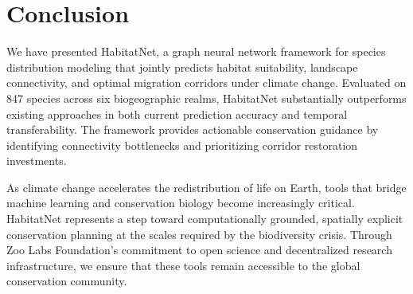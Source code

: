 \section{Conclusion}

\label{sec:conclusion}

We have presented HabitatNet, a graph neural network framework for
species distribution modeling that jointly predicts habitat suitability,
landscape connectivity, and optimal migration corridors under climate
change. Evaluated on 847 species across six biogeographic realms,
HabitatNet substantially outperforms existing approaches in both current
prediction accuracy and temporal transferability. The framework provides
actionable conservation guidance by identifying connectivity bottlenecks
and prioritizing corridor restoration investments.

As climate change accelerates the redistribution of life on Earth, tools
that bridge machine learning and conservation biology become increasingly
critical. HabitatNet represents a step toward computationally grounded,
spatially explicit conservation planning at the scales required by the
biodiversity crisis. Through Zoo Labs Foundation's commitment to open
science and decentralized research infrastructure, we ensure that these
tools remain accessible to the global conservation community.




